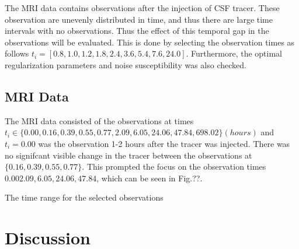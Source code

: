 \documentclass[11pt,a4paper]{article}
\begin{document}
The MRI data contains observations after the injection of CSF tracer. These observation are unevenly distributed in time, and thus there are large time intervals with no observations. Thus the effect of this temporal gap in the observations will be evaluated. This is done by selecting the observation times as follows  $t_i = [0.8, 1.0, 1.2, 1.8, 2.4, 3.6, 5.4, 7.6, 24.0]$. Furthermore, the optimal regularization parameters and noise susceptibility was also checked.



\subsection{MRI Data} 

The MRI data consisted of the observations at times $t_i \in \lbrace 0.00, 0.16, 0.39, 0.55, 0.77, 2.09, 6.05, 24.06, 47.84, 698.02 \rbrace (hours)$ and $t_i=0.00$ was the observation 1-2 hours after the tracer was injected. There was no signifcant visible change in the tracer between the observations at $\lbrace 0.16, 0.39, 0.55, 0.77 \rbrace$. This prompted the focus on the observation times  $0.00 2.09, 6.05, 24.06, 47.84$, which can be seen in Fig.??. 

The time range for the selected observations  





\section{Discussion}
\end{document}
